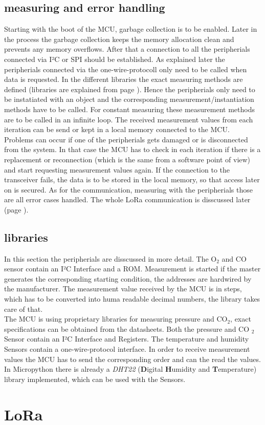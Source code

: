\documentclass[a4paper, 12pt]{article}
\begin{document}
\subsection{measuring and error handling}\label{chap:boot}
Starting with the boot of the MCU, garbage collection is to be enabled. Later in the process the garbage collection keeps the memory allocation clean and prevents any memory overflows. After that a connection to all the peripherials connected via I²C or SPI should be established. As explained later the peripherials connected via the one-wire-protocoll only need to be called when data is requested. In the different libraries the exact measuring methods are defined (libraries are explained from page \pageref{chap:lib}). Hence the peripherials only need to be instatiated with an object and the corresponding measurement/instantiation methods have to be called. For constant measuring these measurement methods are to be called in an infinite loop. The received measurement values from each iteration can be send or kept in a local memory connected to the MCU.\\

Problems can occur if one of the peripherials gets damaged or is disconnected from the system. In that case the MCU has to check in each iteration if there is a replacement or reconnection (which is the same from a software point of view) and start requesting measurement values again. If the connection to the transceiver fails, the data is to be stored in the local memory, so that access later on is secured. As for the communication, measuring with the peripherials those are all error cases handled. The whole LoRa communication is disscussed later (page \pageref{chap:lora}).
\subsection{libraries}\label{chap:lib}
In this section the peripherials are disscussed in more detail. The O$_2$ and CO sensor contain an I²C Interface and a ROM. Measurement is started if the master generates the corresponding starting condition, the addresses are hardwired by the manufacturer. The measurement value received by the MCU is in steps, which has to be converted into huma readable decimal numbers, the library takes care of that.\\
The MCU is using proprietary libraries for measuring pressure and CO$_2$, exact specifications can be obtained from the datasheets. Both the pressure and CO $_2$ Sensor contain an I²C Interface and Registers. The temperature and humidity Sensors contain  a one-wire-protocol interface. In order to receive measurement values the MCU has to send the corresponding order and can the read the values. In Micropython there is already a \textit{DHT22} (\textbf{D}igital \textbf{H}umidity and \textbf{T}emperature) library implemented, which can be used with the Sensors.

\newpage

\section{LoRa}\label{chap:lora}
\end{document}
